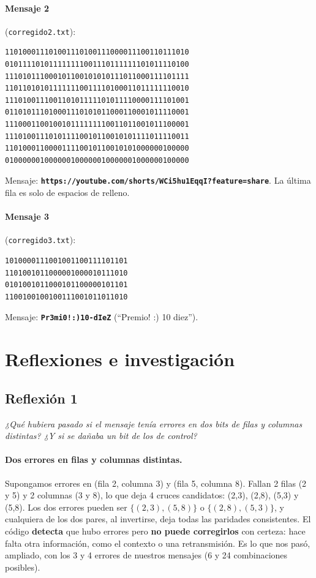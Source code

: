 \documentclass[11pt,a4paper]{article}
\begin{document}
\paragraph{Mensaje 2} (\texttt{corregido2.txt}):
\begin{verbatim}
110100011101001110100111000011100110111010
010111101011111111001110111111101011110100
111010111000101100101010111011000111101111
110110101011111110011110100011011111110010
111010011100110101111101011110000111101001
011010111010001110101011000110001011110001
111000110010010111111110011011001011100001
111010011101011110010110010101111011110011
110100011000011110010110010101000000100000
010000001000000100000010000001000000100000
\end{verbatim}
Mensaje: \textbf{\texttt{https://youtube.com/shorts/WCi5hu1EqqI?feature=share}}. La última fila es solo de espacios de relleno.

\paragraph{Mensaje 3} (\texttt{corregido3.txt}):
\begin{verbatim}
1010000111001001100111101101
1101001011000001000010111010
0101001011000101100000101101
1100100100100111001011011010
\end{verbatim}
Mensaje: \textbf{\texttt{Pr3mi0!:)10-dIeZ}} (``Premio! :) 10 diez'').

\section*{Reflexiones e investigación}

\subsection*{Reflexión 1}

\textit{¿Qué hubiera pasado si el mensaje tenía errores en dos bits de filas y columnas distintas? ¿Y si se dañaba un bit de los de control?}

\medskip

\paragraph{Dos errores en filas y columnas distintas.} Supongamos errores en (fila 2, columna 3) y (fila 5, columna 8). Fallan 2 filas (2 y 5) y 2 columnas (3 y 8), lo que deja 4 cruces candidatos: (2,3), (2,8), (5,3) y (5,8). Los dos errores pueden ser $\{(2,3),(5,8)\}$ o $\{(2,8),(5,3)\}$, y cualquiera de los dos pares, al invertirse, deja todas las paridades consistentes. El código \textbf{detecta} que hubo errores pero \textbf{no puede corregirlos} con certeza: hace falta otra información, como el contexto o una retransmisión. Es lo que nos pasó, ampliado, con los 3 y 4 errores de nuestros mensajes (6 y 24 combinaciones posibles).
\end{document}
